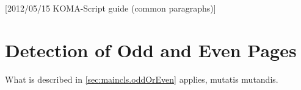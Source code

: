 %
%
%
%
%
%
%
%
% 
%
%
%
%

[2012/05/15 KOMA-Script guide (common paragraphs)]


\makeatletter
{}%
%
%
%
\makeatother


\section{Detection of Odd and Even Pages}
\label{sec:\csname label@base\endcsname.oddOrEven}%
\ifshortversion\IgnoreThisfalse{}\fi%
\ifIgnoreThis %
What is described in
\autoref{sec:maincls.oddOrEven} applies, mutatis mutandis.
\else %
%
%

